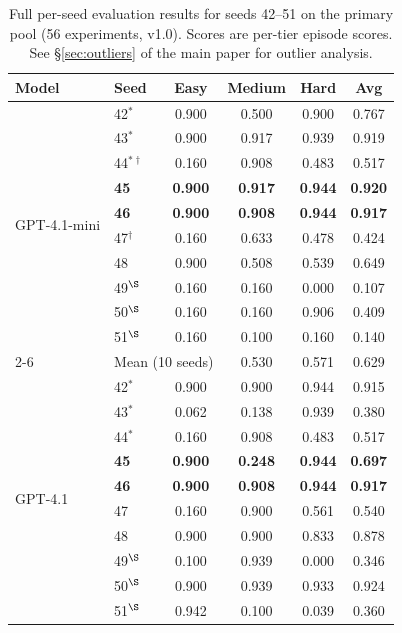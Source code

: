 \documentclass{article}
\begin{document}
\begin{table}[h]
\centering
\caption{Full per-seed evaluation results for seeds 42--51 on the primary pool (56 experiments, v1.0).
Scores are per-tier episode scores.  See \S\ref{sec:outliers} of the main paper for outlier analysis.}
\label{tab:full_seeds}
\small
\begin{tabular}{llcccc}
\toprule
\textbf{Model} & \textbf{Seed} & \textbf{Easy} & \textbf{Medium} & \textbf{Hard} & \textbf{Avg} \\
\midrule
\multirow{10}{*}{GPT-4.1-mini}
  & 42$^*$  & 0.900 & 0.500 & 0.900 & 0.767 \\
  & 43$^*$  & 0.900 & 0.917 & 0.939 & 0.919 \\
  & 44$^{\ast\dagger}$ & 0.160 & 0.908 & 0.483 & 0.517 \\
  & \textbf{45} & \textbf{0.900} & \textbf{0.917} & \textbf{0.944} & \textbf{0.920} \\
  & \textbf{46} & \textbf{0.900} & \textbf{0.908} & \textbf{0.944} & \textbf{0.917} \\
  & 47$^\dagger$ & 0.160 & 0.633 & 0.478 & 0.424 \\
  & 48  & 0.900 & 0.508 & 0.539 & 0.649 \\
  & 49$^\S$ & 0.160 & 0.160 & 0.000 & 0.107 \\
  & 50$^\S$ & 0.160 & 0.160 & 0.906 & 0.409 \\
  & 51$^\S$ & 0.160 & 0.100 & 0.160 & 0.140 \\
\cmidrule{2-6}
  & \multicolumn{2}{l}{\small Mean (10 seeds)} & \small 0.530 & \small 0.571 & \small 0.629 \\
\midrule
\multirow{10}{*}{GPT-4.1}
  & 42$^*$  & 0.900 & 0.900 & 0.944 & 0.915 \\
  & 43$^*$  & 0.062 & 0.138 & 0.939 & 0.380 \\
  & 44$^*$  & 0.160 & 0.908 & 0.483 & 0.517 \\
  & \textbf{45} & \textbf{0.900} & \textbf{0.248} & \textbf{0.944} & \textbf{0.697} \\
  & \textbf{46} & \textbf{0.900} & \textbf{0.908} & \textbf{0.944} & \textbf{0.917} \\
  & 47  & 0.160 & 0.900 & 0.561 & 0.540 \\
  & 48  & 0.900 & 0.900 & 0.833 & 0.878 \\
  & 49$^\S$ & 0.100 & 0.939 & 0.000 & 0.346 \\
  & 50$^\S$ & 0.900 & 0.939 & 0.933 & 0.924 \\
  & 51$^\S$ & 0.942 & 0.100 & 0.039 & 0.360 \\

\end{tabular}
\end{table}
\end{document}

